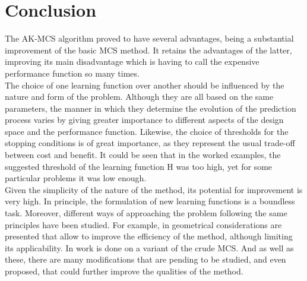 \chapter{Conclusion}
The AK-MCS algorithm proved to have several advantages, being a substantial
improvement of the basic MCS method. It retains the advantages of the latter,
improving its main disadvantage which is having to call the expensive performance
function so many times. \\

The choice of one learning function over another should be influenced by the
nature and form of the problem. Although they are all based on the same parameters,
the manner in which they determine the evolution of the prediction process varies
by giving greater importance to different aspects of the design space and the performance
function. Likewise, the choice of thresholds for the stopping conditions is of great importance,
as they represent the usual trade-off between cost and benefit. It could be seen that in
the worked examples, the suggested threshold of the learning function H was too high,
yet for some particular problems it was low enough. \\

Given the simplicity of the nature of the method, its potential for improvement
is very high. In principle, the formulation of new learning functions is a
boundless task. Moreover, different ways of approaching the problem following the
same principles have been studied. For example, in \citep{Peijuan2017} geometrical considerations
are presented that allow to improve the efficiency of the method, although limiting
its applicability. In \citep{Balesdent2013} work is done on a variant of the crude MCS. And as well
as these, there are many modifications that are pending to be studied, and even
proposed, that could further improve the qualities of the method.